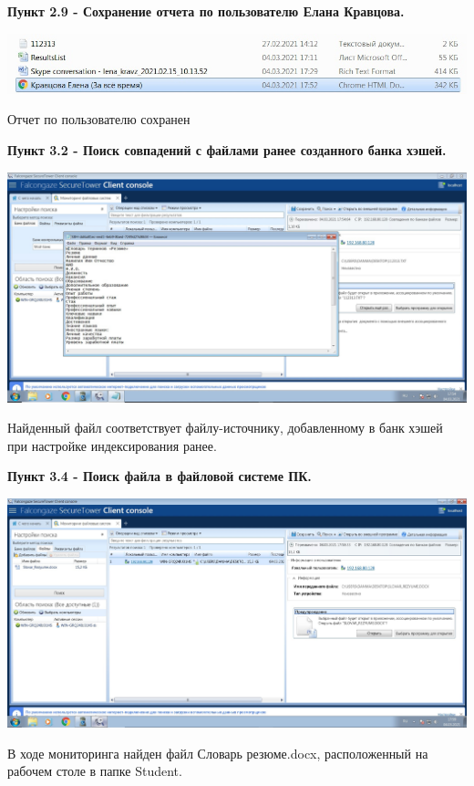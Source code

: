 \documentclass[a4paper,14pt]{extarticle}
\begin{document}
    \textbf{Пункт 2.9 - Сохранение отчета по пользователю Елана Кравцова.} 
    \begin{center}
        \includegraphics[scale=0.4]{pics/2.9.jpg}

        Отчет по пользователю сохранен
    \end{center}

    \vspace{-1.5em}
    \textbf{Пункт 3.2 - Поиск совпадений с файлами ранее созданного банка хэшей.} 
    \begin{center}
        \includegraphics[scale=0.25]{pics/3.2.jpg}

        Найденный файл соответствует файлу-источнику, добавленному в банк
        хэшей при настройке индексирования ранее.
    \end{center}

    \vspace{-1.5em}
    \textbf{Пункт 3.4 - Поиск файла в файловой системе ПК.} 
    \begin{center}
        \includegraphics[scale=0.25]{pics/3.4.jpg}

        В ходе мониторинга найден файл Словарь резюме.docx, расположенный
        на рабочем столе в папке Student.
    \end{center}
\end{document}
